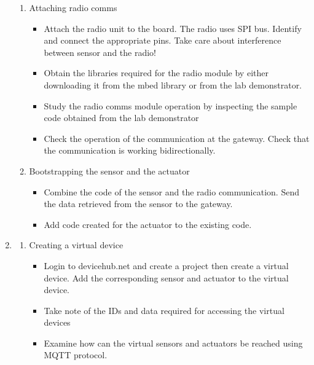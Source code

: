\documentclass[a4paper]{article}
\begin{document}
\begin{enumerate}
\begin{enumerate}
              \item Attaching radio comms
                    \begin{itemize}
                        \item Attach the radio unit to the board. The radio uses SPI bus. Identify and connect the
                              appropriate pins. Take care about interference between sensor and the radio!
                        \item Obtain the libraries required for the radio module by either downloading it from the
                              mbed library or from the lab demonstrator.
                        \item Study the radio comms module operation by inspecting the sample code obtained from the
                              lab demonstrator
                        \item Check the operation of the communication at the gateway. Check that the communication is
                              working bidirectionally.
                    \end{itemize}
              \item Bootstrapping the sensor and the actuator
                    \begin{itemize}
                        \item Combine the code of the sensor and the radio communication. Send the data retrieved
                              from the sensor to the gateway.
                        \item Add code created for the actuator to the existing code.
                    \end{itemize}
          \end{enumerate}
    \item \begin{enumerate}
              \item Creating a virtual device
                    \begin{itemize}
                        \item Login to devicehub.net and create a project then create a virtual device.
                              Add the corresponding sensor and actuator to the virtual device.
                        \item Take note of the IDs and data required for accessing the virtual devices
                        \item Examine how can the virtual sensors and actuators be reached using MQTT protocol.

\end{itemize}
\end{enumerate}
\end{enumerate}
\end{document}
